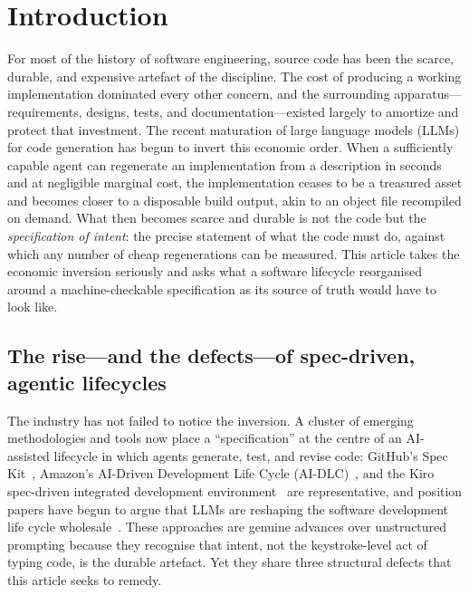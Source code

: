 \section{Introduction}
\label{sec:introduction}

For most of the history of software engineering, source code has been the scarce, durable, and expensive artefact of the discipline. The cost of producing a working implementation dominated every other concern, and the surrounding apparatus---requirements, designs, tests, and documentation---existed largely to amortize and protect that investment. The recent maturation of large language models (LLMs) for code generation has begun to invert this economic order. When a sufficiently capable agent can regenerate an implementation from a description in seconds and at negligible marginal cost, the implementation ceases to be a treasured asset and becomes closer to a disposable build output, akin to an object file recompiled on demand. What then becomes scarce and durable is not the code but the \emph{specification of intent}: the precise statement of what the code must do, against which any number of cheap regenerations can be measured. This article takes the economic inversion seriously and asks what a software lifecycle reorganised around a machine-checkable specification as its source of truth would have to look like.

\subsection{The rise---and the defects---of spec-driven, agentic lifecycles}
\label{subsec:intro-agentic}

The industry has not failed to notice the inversion. A cluster of emerging methodologies and tools now place a ``specification'' at the centre of an AI-assisted lifecycle in which agents generate, test, and revise code: GitHub's Spec Kit~\cite{githubspeckit}, Amazon's AI-Driven Development Life Cycle (AI-DLC)~\cite{awsaidlc}, and the Kiro spec-driven integrated development environment~\cite{awskiro} are representative, and position papers have begun to argue that LLMs are reshaping the software development life cycle wholesale~\cite{ozkaya2023llmse}. These approaches are genuine advances over unstructured prompting because they recognise that intent, not the keystroke-level act of typing code, is the durable artefact. Yet they share three structural defects that this article seeks to remedy.

